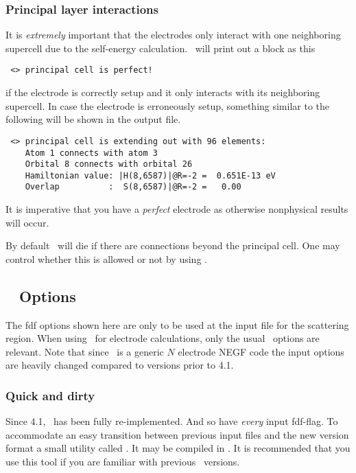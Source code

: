 \subsubsection{Principal layer interactions} %
%

It is \emph{extremely} important that the electrodes only interact
with one neighboring supercell due to the self-energy
calculation\cite{Sancho1985}. \tsiesta\ will print out a block as this
\begin{verbatim}
 <> principal cell is perfect!
\end{verbatim}
if the electrode is correctly setup and it only interacts with its
neighboring supercell.
%
In case the electrode is erroneously setup, something similar to the
following will be shown in the output file.
\begin{verbatim}
 <> principal cell is extending out with 96 elements:
    Atom 1 connects with atom 3
    Orbital 8 connects with orbital 26
    Hamiltonian value: |H(8,6587)|@R=-2 =  0.651E-13 eV
    Overlap          :  S(8,6587)|@R=-2 =   0.00    
\end{verbatim}
It is imperative that you have a \emph{perfect} electrode as otherwise
nonphysical results will occur.

By default \tsiesta\ will die if there are connections beyond the
principal cell. One may control whether this is allowed or not by
using .

\subsection{\texorpdfstring{\tsiesta\ }{TranSIESTA} Options}

The fdf options shown here are only to be used at the input file for
the scattering region. When using \tsiesta\ for electrode
calculations, only the usual \siesta\ options are relevant.
%
Note that since \tsiesta\ is a generic $N$ electrode NEGF code the
input options are heavily changed compared to versions prior to 4.1.

\subsubsection{Quick and dirty}

Since 4.1, \tsiesta\ has been fully re-implemented. And so have
\emph{every} input fdf-flag. To accommodate an easy transition between
previous input files and the new version format a small utility called
. It may be compiled in . It is
recommended that you use this tool if you are familiar with previous
\tsiesta\ versions.

